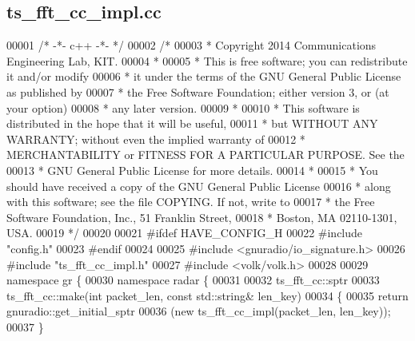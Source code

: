\subsection{ts\+\_\+fft\+\_\+cc\+\_\+impl.\+cc}
\label{ts__fft__cc__impl_8cc_source}

\begin{DoxyCode}
00001 \textcolor{comment}{/* -*- c++ -*- */}
00002 \textcolor{comment}{/* }
00003 \textcolor{comment}{ * Copyright 2014 Communications Engineering Lab, KIT.}
00004 \textcolor{comment}{ * }
00005 \textcolor{comment}{ * This is free software; you can redistribute it and/or modify}
00006 \textcolor{comment}{ * it under the terms of the GNU General Public License as published by}
00007 \textcolor{comment}{ * the Free Software Foundation; either version 3, or (at your option)}
00008 \textcolor{comment}{ * any later version.}
00009 \textcolor{comment}{ * }
00010 \textcolor{comment}{ * This software is distributed in the hope that it will be useful,}
00011 \textcolor{comment}{ * but WITHOUT ANY WARRANTY; without even the implied warranty of}
00012 \textcolor{comment}{ * MERCHANTABILITY or FITNESS FOR A PARTICULAR PURPOSE.  See the}
00013 \textcolor{comment}{ * GNU General Public License for more details.}
00014 \textcolor{comment}{ * }
00015 \textcolor{comment}{ * You should have received a copy of the GNU General Public License}
00016 \textcolor{comment}{ * along with this software; see the file COPYING.  If not, write to}
00017 \textcolor{comment}{ * the Free Software Foundation, Inc., 51 Franklin Street,}
00018 \textcolor{comment}{ * Boston, MA 02110-1301, USA.}
00019 \textcolor{comment}{ */}
00020  
00021 \textcolor{preprocessor}{#ifdef HAVE\_CONFIG\_H}
00022 \textcolor{preprocessor}{#include "config.h"}
00023 \textcolor{preprocessor}{#endif}
00024 
00025 \textcolor{preprocessor}{#include <gnuradio/io\_signature.h>}
00026 \textcolor{preprocessor}{#include "ts_fft_cc_impl.h"}
00027 \textcolor{preprocessor}{#include <volk/volk.h>}
00028 
00029 \textcolor{keyword}{namespace }gr \{
00030   \textcolor{keyword}{namespace }radar \{
00031 
00032     ts_fft_cc::sptr
00033     ts_fft_cc::make(\textcolor{keywordtype}{int} packet\_len, \textcolor{keyword}{const} std::string& len\_key)
00034     \{
00035       \textcolor{keywordflow}{return} gnuradio::get\_initial\_sptr
00036         (\textcolor{keyword}{new} ts_fft_cc_impl(packet\_len, len\_key));
00037     \}

\end{DoxyCode}
